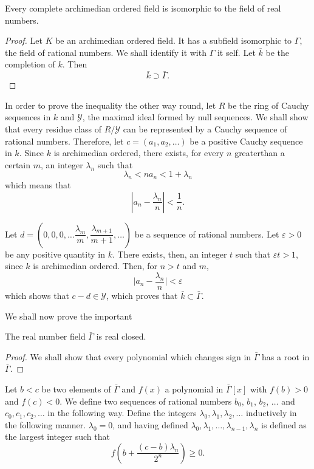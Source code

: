 \begin{thm}%
Every complete archimedian ordered  field is  isomorphic to the
  field of real numbers. 
\end{thm}

\begin{proof}
Let $K$ be an archimedian ordered field. It has a subfield isomorphic
to $ \Gamma $, the field of rational numbers. We shall identify it
with $ \Gamma $ it self. Let $\bar{k}$ be the completion of
$k$. Then  
$$
\bar{k} \supset \bar{\Gamma}.
$$
\end{proof}

In order to prove the inequality the  other way round, let $R$ be the
ring of Cauchy sequences in $k$ and $ \mathscr{Y} $, the  maximal
ideal formed by null sequences. We shall show that every residue class
of  $ R / \mathscr{Y} $ can be represented by a Cauchy sequence of
rational numbers.  Therefore, let $ c = ( a_1,a_2 , \ldots ) $  be a
positive Cauchy sequence in $k$. Since $k$ is archimedian ordered,
there exists, for every $n$ greater\pageoriginale than  a certain $m$,
an integer $ \lambda_n $ such that   
$$
\lambda_n < n  a_n <  1 + \lambda_n 
$$
which means that 
$$
\left| a_n -   \frac{\lambda_n}{n} \right|   <  \frac{1}{n}.
$$

Let $ d = ( 0 , 0, 0,  \ldots \dfrac{\lambda_m}{m},
\dfrac{\lambda_{m+1}}{m+1}, \ldots )$ be a sequence of rational
numbers. Let $ \varepsilon > 0 $ be any positive quantity in
$k$. There exists, then, an integer $t$ such that $ \varepsilon t > 1
$, since $k$ is archimedian ordered. Then, for  $ n > t $ and $m$, 
$$
\big | a_n  - \frac{\lambda_n}{n}  \big |< \varepsilon
$$ 
which shows that $ c - d \in \mathscr{Y} $, which proves that $
\bar{k} \subset \bar{\Gamma} $.  

We shall now prove the important 

\begin{thm}%
 The real number field $\bar{\Gamma} $ is real closed.
\end{thm}

\begin{proof}
We shall show that every polynomial which changes sign in $
\bar{\Gamma} $ has  a root in $ \bar\Gamma $.  
\end{proof}

Let $ b < c $ be two elements of  $ \bar{\Gamma} $ and $ f (x) $ a
polynomial in $ \bar{\Gamma} [ x ]$  with $ f (b) > 0 $ and  $ f (c) <
0 $. We define two sequences of rational numbers  $ b_0$, $b_1$, $b_2$,
$\ldots $ and $ c_0, c_1, c_2, \ldots $ in the following way. Define
the integers $ \lambda_0, \lambda_1, \lambda_2, \ldots $ inductively
in the following manner. $ \lambda_0 = 0 $, and having defined  $
\lambda_0, \lambda_1 , \ldots , \lambda_{n-1}, \lambda_n $ is  defined
as the largest integer such that  
$$
f ( b + \frac{( c -b ) \lambda_n}{2^n} ) \ge 0 .
$$

